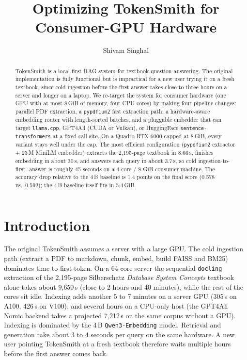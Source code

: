 \documentclass[sigconf]{acmart}
\begin{document}
\title{Optimizing TokenSmith for Consumer-GPU Hardware}

\author{Shivam Singhal}
\renewcommand{\shortauthors}{Singhal}

\begin{abstract}
TokenSmith is a local-first RAG system for textbook question answering.
The original implementation is fully functional but is impractical for
a new user trying it on a fresh textbook, since cold ingestion before
the first answer takes close to three hours on a server and longer on
a laptop. We re-target the system for consumer hardware (one GPU with
at most 8\,GiB of memory, four CPU cores) by making four pipeline
changes: parallel PDF extraction, a \texttt{pypdfium2} fast extraction
path, a hardware-aware embedding router with length-sorted batches,
and a pluggable embedder that can target \texttt{llama.cpp}, GPT4All
(CUDA or Vulkan), or HuggingFace \texttt{sentence-transformers} at a
fixed call site. On a Quadro RTX 6000 capped at 8\,GiB, every variant
stays well under the cap. The most efficient configuration
(\texttt{pypdfium2} extractor + 23\,M MiniLM embedder) extracts the
2{,}195-page textbook in 8.66\,s, finishes embedding in about 30\,s,
and answers each query in about 3.7\,s, so cold ingestion-to-first-
answer is roughly 45 seconds on a 4-core / 8-GiB consumer machine. The
accuracy drop relative to the 4\,B baseline is 1.4 points on the
final score (0.578 vs.\ 0.592); the 4\,B baseline itself fits in
5.4\,GiB.
\end{abstract}


\maketitle

\section{Introduction}

The original TokenSmith assumes a server with a large GPU. The cold
ingestion path (extract a PDF to markdown, chunk, embed, build FAISS
and BM25) dominates time-to-first-token. On a 64-core server the
sequential \texttt{docling} extraction of the 2{,}195-page Silberschatz
\emph{Database System Concepts} textbook alone takes about 9{,}650\,s
(close to 2 hours and 40 minutes), while the rest of the cores sit
idle. Indexing adds another 5 to 7 minutes on a server GPU (305\,s on
A100, 426\,s on V100), and several hours on a CPU-only host (the
GPT4All Nomic backend takes a projected 7{,}212\,s on the same corpus
without a GPU). Indexing is dominated by the 4\,B \texttt{Qwen3-Embedding}
model. Retrieval and generation take about 3 to 4 seconds per query
on the same hardware. A new user pointing TokenSmith at a fresh textbook
therefore waits multiple hours before the first answer comes back.
\end{document}
